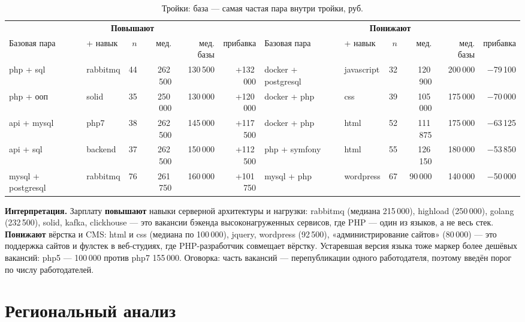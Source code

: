 \documentclass[11pt,a4paper]{article}
\begin{document}
\begin{table}[H]
\centering
\scriptsize
\setlength{\tabcolsep}{3pt}
\caption{Тройки: база --- самая частая пара внутри тройки, руб.}
\begin{tabular}{@{}llrrrr|llrrrr@{}}
\toprule
\multicolumn{6}{c|}{\textcolor{ok}{\textbf{Повышают}}} & \multicolumn{6}{c}{\textcolor{bad}{\textbf{Понижают}}} \\
Базовая пара & + навык & $n$ & мед. & мед. базы & прибавка & Базовая пара & + навык & $n$ & мед. & мед. базы & прибавка \\
\midrule
php + sql & rabbitmq & 44 & 262\,500 & 130\,500 & +132\,000 & docker + postgresql & javascript & 32 & 120\,900 & 200\,000 & $-$79\,100 \\
php + ооп & solid & 35 & 250\,000 & 130\,000 & +120\,000 & docker + php & css & 39 & 105\,000 & 175\,000 & $-$70\,000 \\
api + mysql & php7 & 38 & 262\,500 & 145\,000 & +117\,500 & docker + php & html & 52 & 111\,875 & 175\,000 & $-$63\,125 \\
api + sql & backend & 37 & 262\,500 & 150\,000 & +112\,500 & php + symfony & html & 55 & 126\,150 & 180\,000 & $-$53\,850 \\
mysql + postgresql & rabbitmq & 76 & 261\,750 & 160\,000 & +101\,750 & mysql + php & wordpress & 67 & 90\,000 & 140\,000 & $-$50\,000 \\
\bottomrule
\end{tabular}
\end{table}

\textbf{Интерпретация.} Зарплату \textbf{повышают} навыки серверной архитектуры и нагрузки: rabbitmq (медиана 215\,000), highload (250\,000), golang (232\,500), solid, kafka, clickhouse --- это вакансии бэкенда высоконагруженных сервисов, где PHP --- один из языков, а не весь стек. \textbf{Понижают} вёрстка и CMS: html и css (медиана по 100\,000), jquery, wordpress (92\,500), «администрирование сайтов» (80\,000) --- это поддержка сайтов и фулстек в веб-студиях, где PHP-разработчик совмещает вёрстку. Устаревшая версия языка тоже маркер более дешёвых вакансий: php5 --- 100\,000 против php7 155\,000. Оговорка: часть вакансий --- перепубликации одного работодателя, поэтому введён порог по числу работодателей.

\section{Региональный анализ}
\end{document}
